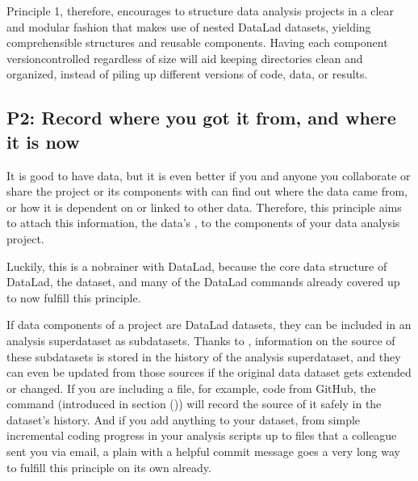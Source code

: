 \sphinxAtStartPar
Principle 1, therefore, encourages to structure data analysis
projects in a clear and modular fashion that makes use of nested
DataLad datasets, yielding comprehensible structures and reusable
components. Having each component version\sphinxhyphen{}controlled \textendash{}
regardless of size \textendash{}  will aid keeping directories clean and
organized, instead of piling up different versions of code, data,
or results.


\subsection{P2: Record where you got it from, and where it is now}
\label{\detokenize{basics/101-127-yoda:p2-record-where-you-got-it-from-and-where-it-is-now}}\label{\detokenize{basics/101-127-yoda:p2}}
\sphinxAtStartPar
It is good to have data, but it is even better if you and anyone you
collaborate or share the project or its components with can find
out where the data came from, or how it
is dependent on or linked to other data. Therefore, this principle
aims to attach this information, the data’s {\hyperref[\detokenize{glossary:term-provenance}]{}}, to the components of
your data analysis project.

\sphinxAtStartPar
Luckily, this is a no\sphinxhyphen{}brainer with DataLad, because the core data structure
of DataLad, the dataset, and many of the DataLad commands already covered
up to now fulfill this principle.

\sphinxAtStartPar
If data components of a project are DataLad datasets, they can
be included in an analysis superdataset as subdatasets. Thanks to
, information on the source of these subdatasets
is stored in the history of the analysis superdataset, and they can even be
updated from those sources if the original data dataset gets extended or changed.
If you are including a file, for example, code from GitHub,
the  command (introduced in section {\hyperref[\detokenize{basics/101-102-populate:populate}]{}} ())
will record the source of it safely in the dataset’s history. And if you add anything to your dataset,
from simple incremental coding progress in your analysis scripts up to
files that a colleague sent you via email, a plain 
with a helpful commit message goes a very long way to fulfill this principle
on its own already.

